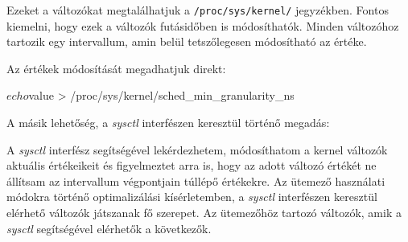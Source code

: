 Ezeket a változókat megtalálhatjuk a \texttt{/proc/sys/kernel/} jegyzékben. Fontos kiemelni, hogy ezek a változók futásidőben is módosíthatók. Minden változóhoz tartozik egy intervallum, amin belül tetszőlegesen módosítható az értéke. 

Az értékek módosítását megadhatjuk direkt:
\begin{python}
$ echo $value > /proc/sys/kernel/sched_min_granularity_ns
\end{python}%

A másik lehetőség, a \textit{sysctl} interfészen keresztül történő megadás:
A \textit{sysctl} interfész segítségével lekérdezhetem, módosíthatom a kernel változók aktuális értékeikeit és figyelmeztet arra is, hogy az adott változó értékét ne állítsam az intervallum végpontjain túllépő értékekre.
Az ütemező használati módokra történő optimalizálási kísérletemben, a \textit{sysctl} interfészen keresztül elérhető változók játszanak fő szerepet. Az ütemezőhöz tartozó változók, amik a \textit{sysctl} segítségével elérhetők a következők.

